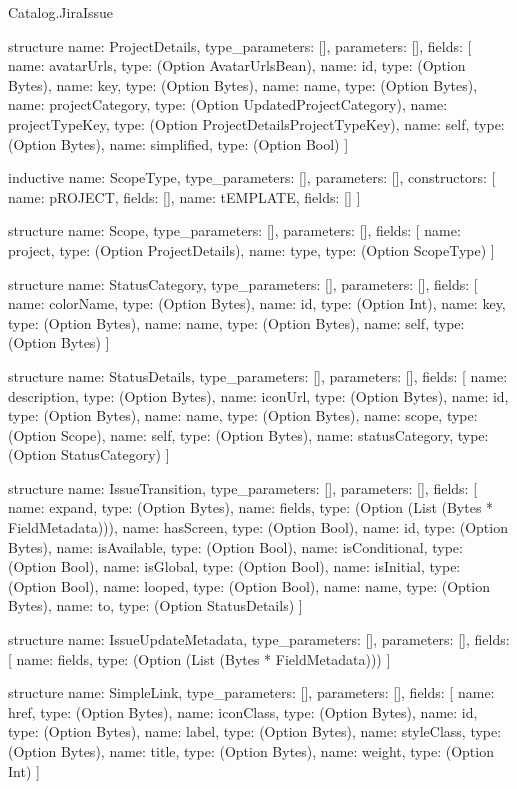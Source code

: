 \begin{lexlean}{Catalog.JiraIssue}
\begin{semanticmodule}
structure{
  name: ProjectDetails,
  type_parameters: [],
  parameters: [],
  fields: [
    {name: avatarUrls, type: (Option AvatarUrlsBean)},
    {name: id, type: (Option Bytes)},
    {name: key, type: (Option Bytes)},
    {name: name, type: (Option Bytes)},
    {name: projectCategory, type: (Option UpdatedProjectCategory)},
    {name: projectTypeKey, type: (Option ProjectDetailsProjectTypeKey)},
    {name: self, type: (Option Bytes)},
    {name: simplified, type: (Option Bool)}
  ]
}

inductive{
  name: ScopeType,
  type_parameters: [],
  parameters: [],
  constructors: [
    {name: pROJECT, fields: []},
    {name: tEMPLATE, fields: []}
  ]
}

structure{
  name: Scope,
  type_parameters: [],
  parameters: [],
  fields: [
    {name: project, type: (Option ProjectDetails)},
    {name: type, type: (Option ScopeType)}
  ]
}

structure{
  name: StatusCategory,
  type_parameters: [],
  parameters: [],
  fields: [
    {name: colorName, type: (Option Bytes)},
    {name: id, type: (Option Int)},
    {name: key, type: (Option Bytes)},
    {name: name, type: (Option Bytes)},
    {name: self, type: (Option Bytes)}
  ]
}

structure{
  name: StatusDetails,
  type_parameters: [],
  parameters: [],
  fields: [
    {name: description, type: (Option Bytes)},
    {name: iconUrl, type: (Option Bytes)},
    {name: id, type: (Option Bytes)},
    {name: name, type: (Option Bytes)},
    {name: scope, type: (Option Scope)},
    {name: self, type: (Option Bytes)},
    {name: statusCategory, type: (Option StatusCategory)}
  ]
}

structure{
  name: IssueTransition,
  type_parameters: [],
  parameters: [],
  fields: [
    {name: expand, type: (Option Bytes)},
    {name: fields, type: (Option (List (Bytes * FieldMetadata)))},
    {name: hasScreen, type: (Option Bool)},
    {name: id, type: (Option Bytes)},
    {name: isAvailable, type: (Option Bool)},
    {name: isConditional, type: (Option Bool)},
    {name: isGlobal, type: (Option Bool)},
    {name: isInitial, type: (Option Bool)},
    {name: looped, type: (Option Bool)},
    {name: name, type: (Option Bytes)},
    {name: to, type: (Option StatusDetails)}
  ]
}

structure{
  name: IssueUpdateMetadata,
  type_parameters: [],
  parameters: [],
  fields: [
    {name: fields, type: (Option (List (Bytes * FieldMetadata)))}
  ]
}

structure{
  name: SimpleLink,
  type_parameters: [],
  parameters: [],
  fields: [
    {name: href, type: (Option Bytes)},
    {name: iconClass, type: (Option Bytes)},
    {name: id, type: (Option Bytes)},
    {name: label, type: (Option Bytes)},
    {name: styleClass, type: (Option Bytes)},
    {name: title, type: (Option Bytes)},
    {name: weight, type: (Option Int)}
  ]
}


\end{semanticmodule}
\end{lexlean}
